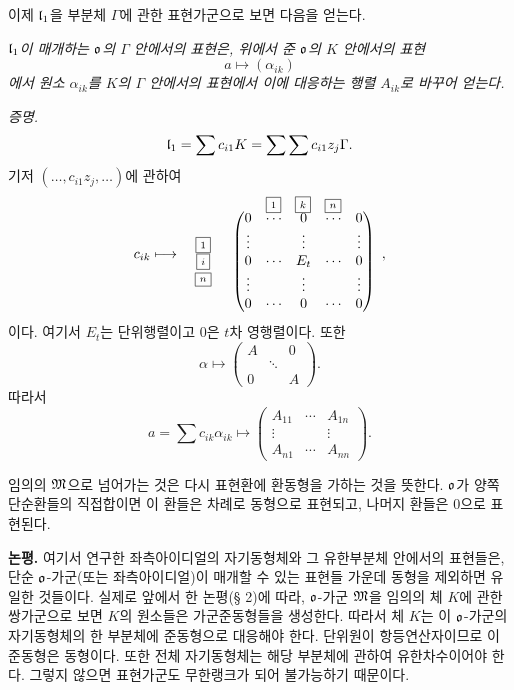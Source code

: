 이제 \(\mathfrak l_1\)을 부분체 \(\Gamma\)에 관한 표현가군으로 보면 다음을 얻는다.

\emph{\(\mathfrak l_1\)이 매개하는 \(\mathfrak o\)의 \(\Gamma\) 안에서의 표현은, 위에서 준 \(\mathfrak o\)의 \(K\) 안에서의 표현}
\[
        a\longmapsto(\alpha_{ik})
\]
\emph{에서 원소 \(\alpha_{ik}\)를 \(K\)의 \(\Gamma\) 안에서의 표현에서 이에 대응하는 행렬 \(A_{ik}\)로 바꾸어 얻는다.}

\emph{증명.}
\[
        \mathfrak l_1=\sum c_{i1}K=\sum\sum c_{i1}z_j\Gamma.
\]
기저 \((\ldots,c_{i1}z_j,\ldots)\)에 관하여
\[
c_{ik}\longmapsto
\begin{array}{c@{\quad}c}
 & \begin{array}{ccc}
 \boxed{\scriptstyle 1}&\boxed{\scriptstyle k}&\boxed{\scriptstyle n}
 \end{array}\\[-.2em]
\begin{array}{c}
\boxed{\scriptstyle 1}\\ \boxed{\scriptstyle i}\\ \boxed{\scriptstyle n}
\end{array}
&
\begin{pmatrix}
0&\cdots&0&\cdots&0\\
\vdots&&\vdots&&\vdots\\
0&\cdots&E_t&\cdots&0\\
\vdots&&\vdots&&\vdots\\
0&\cdots&0&\cdots&0
\end{pmatrix}
\end{array},
\]
이다. 여기서 \(E_t\)는 단위행렬이고 0은 \(t\)차 영행렬이다. 또한
\[
        \alpha\longmapsto
        \begin{pmatrix}
        A& &0\\
         &\ddots&\\
        0& &A
        \end{pmatrix}.
\]
따라서
\[
        a=\sum c_{ik}\alpha_{ik}\longmapsto
        \begin{pmatrix}
        A_{11}&\cdots&A_{1n}\\
        \vdots&&\vdots\\
        A_{n1}&\cdots&A_{nn}
        \end{pmatrix}.
\]

임의의 \(\mathfrak M\)으로 넘어가는 것은 다시 표현환에 환동형을 가하는 것을 뜻한다. \(\mathfrak o\)가 양쪽단순환들의 직접합이면 이 환들은 차례로 동형으로 표현되고, 나머지 환들은 0으로 표현된다.

\textbf{논평.} 여기서 연구한 좌측아이디얼의 자기동형체와 그 유한부분체 안에서의 표현들은, 단순 \(\mathfrak o\)-가군(또는 좌측아이디얼)이 매개할 수 있는 표현들 가운데 동형을 제외하면 유일한 것들이다. 실제로 앞에서 한 논평(§ 2)에 따라, \(\mathfrak o\)-가군 \(\mathfrak M\)을 임의의 체 \(K\)에 관한 쌍가군으로 보면 \(K\)의 원소들은 가군준동형들을 생성한다. 따라서 체 \(K\)는 이 \(\mathfrak o\)-가군의 자기동형체의 한 부분체에 준동형으로 대응해야 한다. 단위원이 항등연산자이므로 이 준동형은 동형이다. 또한 전체 자기동형체는 해당 부분체에 관하여 유한차수이어야 한다. 그렇지 않으면 표현가군도 무한랭크가 되어 불가능하기 때문이다.


